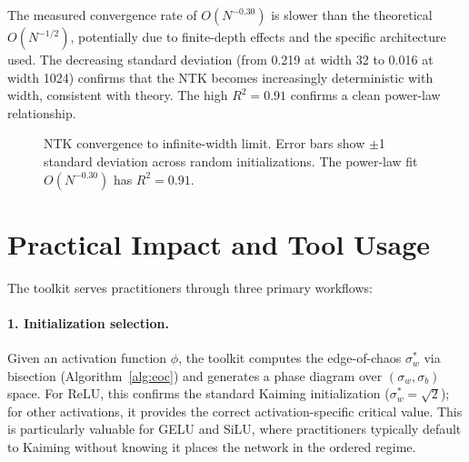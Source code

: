 \documentclass[10pt]{article}
\begin{document}
The measured convergence rate of $O(N^{-0.30})$ is slower than the theoretical $O(N^{-1/2})$, potentially due to finite-depth effects and the specific architecture used.
The decreasing standard deviation (from 0.219 at width 32 to 0.016 at width 1024) confirms that the NTK becomes increasingly deterministic with width, consistent with theory.
The high $R^2 = 0.91$ confirms a clean power-law relationship.

\begin{figure}[t]
\centering
{}
\caption{NTK convergence to infinite-width limit.  Error bars show $\pm$1 standard deviation across random initializations.  The power-law fit $O(N^{-0.30})$ has $R^2 = 0.91$.}
\label{fig:ntk-convergence}
\end{figure}


\section{Practical Impact and Tool Usage}
\label{sec:practical}

The toolkit serves practitioners through three primary workflows:

\paragraph{1. Initialization selection.}
Given an activation function $\phi$, the toolkit computes the edge-of-chaos $\sigma_w^*$ via bisection (Algorithm~\ref{alg:eoc}) and generates a phase diagram over $(\sigma_w, \sigma_b)$ space.
For ReLU, this confirms the standard Kaiming initialization ($\sigma_w^* = \sqrt{2}$); for other activations, it provides the correct activation-specific critical value.
This is particularly valuable for GELU and SiLU, where practitioners typically default to Kaiming without knowing it places the network in the ordered regime.
\end{document}
